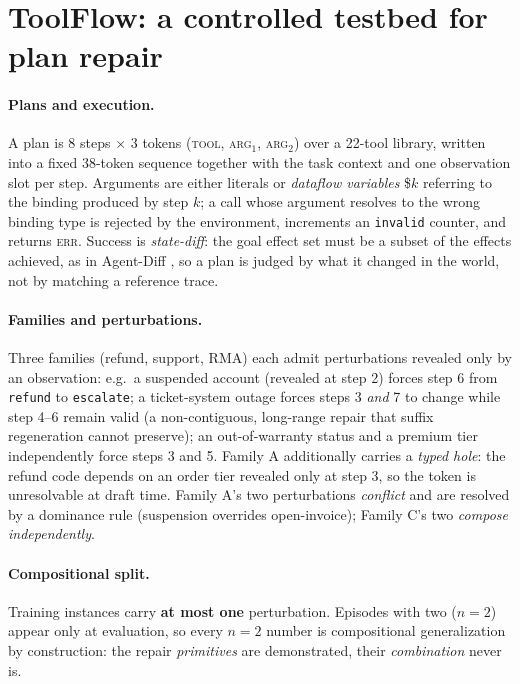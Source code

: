 \documentclass{article}
\begin{document}
\section{ToolFlow: a controlled testbed for plan repair}\label{sec:env}

\paragraph{Plans and execution.} A plan is $8$ steps $\times$ $3$ tokens
(\textsc{tool}, \textsc{arg}$_1$, \textsc{arg}$_2$) over a 22-tool library, written into a fixed
38-token sequence together with the task context and one observation slot per step. Arguments are
either literals or \emph{dataflow variables} \$$k$ referring to the binding produced by step $k$;
a call whose argument resolves to the wrong binding type is rejected by the environment, increments
an \texttt{invalid} counter, and returns \textsc{err}. Success is \emph{state-diff}: the goal effect
set must be a subset of the effects achieved, as in Agent-Diff \citep{agentdiff2026}, so a plan is
judged by what it changed in the world, not by matching a reference trace.

\paragraph{Families and perturbations.} Three families (refund, support, RMA) each admit
perturbations revealed only by an observation: e.g.\ a suspended account (revealed at step 2) forces
step 6 from \texttt{refund} to \texttt{escalate}; a ticket-system outage forces steps 3 \emph{and} 7
to change while step 4--6 remain valid (a non-contiguous, long-range repair that suffix regeneration
cannot preserve); an out-of-warranty status and a premium tier independently force steps 3 and 5.
Family A additionally carries a \emph{typed hole}: the refund code depends on an order tier revealed
only at step 3, so the token is unresolvable at draft time. Family A's two perturbations
\emph{conflict} and are resolved by a dominance rule (suspension overrides open-invoice); Family C's
two \emph{compose independently}.

\paragraph{Compositional split.} Training instances carry \textbf{at most one} perturbation. Episodes
with two ($n{=}2$) appear only at evaluation, so every $n{=}2$ number is compositional
generalization by construction: the repair \emph{primitives} are demonstrated, their
\emph{combination} never is.
\end{document}
